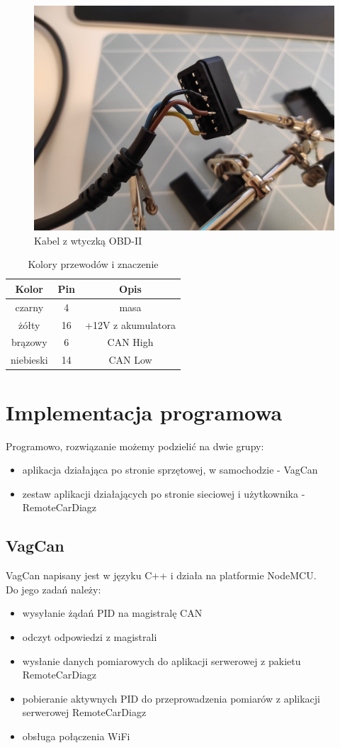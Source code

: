 \documentclass[10pt,a4paper]{article}
\begin{document}
		\begin{figure}[H]
			\centering
			\includegraphics[width=0.7\linewidth]{kabel_obd_2}
			\caption[Kabel z wtyczką OBD-II]{Kabel z wtyczką OBD-II}
			\label{fig:kabelobd2}
		\end{figure}
		
			\begin{table}[H]
			\caption{Kolory przewodów i znaczenie}
			\begin{tabular}{|c|c|c|}
				\hline
				Kolor & Pin & Opis \\
				\hline
				czarny & 4 & masa \\
				\hline
				żółty & 16 & +12V z akumulatora \\
				\hline
				brązowy &6 & CAN High \\			
				\hline
				niebieski &14 & CAN Low \\			
				\hline
			\end{tabular}
		\end{table}
	
	
	\section{Implementacja programowa}
	Programowo, rozwiązanie możemy podzielić na dwie grupy:
		\begin{itemize}
			\item aplikacja działająca po stronie sprzętowej, w samochodzie - VagCan
			\item zestaw aplikacji działających po stronie sieciowej i użytkownika - RemoteCarDiagz
		\end{itemize}
		\subsection{VagCan}
		VagCan napisany jest w języku C++ i działa na platformie NodeMCU.\\
		Do jego zadań należy:
		\begin{itemize}
			\item wysyłanie żądań PID na magistralę CAN
			\item odczyt odpowiedzi z magistrali
			\item wysłanie danych pomiarowych do aplikacji serwerowej z pakietu RemoteCarDiagz
			\item pobieranie aktywnych PID do przeprowadzenia pomiarów z aplikacji serwerowej RemoteCarDiagz
			\item obsługa połączenia WiFi
		\end{itemize}
\end{document}
